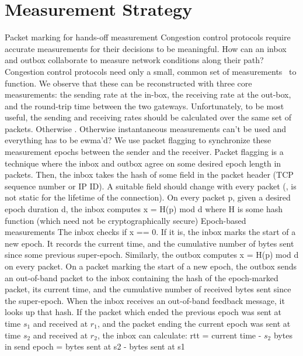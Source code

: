 \section{Measurement Strategy}\label{s:measurement}
\begin{outline}
\1 Packet marking for hands-off measurement
    \2 Congestion control protocols require accurate measurements for their decisions to be meaningful. How can an inbox and outbox collaborate to measure network conditions along their path?
    \2 Congestion control protocols need only a small, common set of measurements~\cite{ccp-hotnets} to function. We observe that these can be reconstructed with three core measurements: the sending rate at the in-box, the receiving rate at the out-box, and the round-trip time between the two gateways.
    \2 Unfortunately, to be most useful, the sending and receiving rates should be calculated over the same set of packets. Otherwise .
        \3 Otherwise instantaneous measurements can't be used and everything has to be ewma'd?
    \2 We use packet flagging to synchronize these measurement epochs between the sender and the receiver.
    \2 Packet flagging is a technique where the inbox and outbox agree on some desired epoch length in packets.
    \2 Then, the inbox takes the hash of some field in the packet header (\eg TCP sequence number or IP ID).   
        \3 A suitable field should change with every packet (\ie, is not static for the lifetime of the connection).
        \3 On every packet p, given a desired epoch duration d, the inbox computes x = H(p) mod d where H is some hash function (which need not be cryptographically secure)
    \2 Epoch-based measurements
        \3 The inbox checks if x == 0. If it is, the inbox marks the start of a new epoch. It records the current time, and the cumulative number of bytes sent since some previous super-epoch.
        \3 Similarly, the outbox computes x = H(p) mod d on every packet. On a packet marking the start of a new epoch, the outbox sends an out-of-band packet to the inbox containing the hash of the epoch-marked packet, its current time, and the cumulative number of received bytes sent since the super-epoch.
        \3 When the inbox receives an out-of-band feedback message, it looks up that hash. If the packet which ended the previous epoch was sent at time $s_1$ and received at $r_1$, and the packet ending the current epoch was sent at time $s_2$ and received at $r_2$, the inbox can calculate:
            \4 rtt = current time - $s_2$
            \4 bytes in send epoch = bytes sent at s2 - bytes sent at s1

\end{outline}
